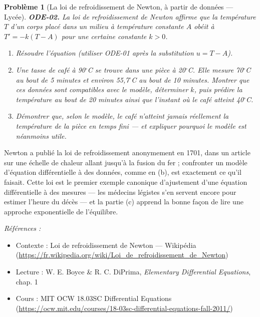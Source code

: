 \documentclass[11pt]{article}
\newtheorem{problem}{Problème}
\newenvironment{refs}{\par\small\noindent\emph{Références :}\begin{itemize}\setlength\itemsep{0pt}}{\end{itemize}\normalsize}
\begin{document}
\bigskip

\begin{problem}[{La loi de refroidissement de Newton, à partir de données --- Lycée}]
\textbf{ODE-02.} La loi de refroidissement de Newton affirme que la température $ T $ d'un
corps placé dans un milieu à température constante $ A $ obéit à $ T' = -k (T - A) $ pour une
certaine constante $ k >0 $.
\begin{enumerate}
\item[(a)] Résoudre l'équation (utiliser ODE-01 après la substitution $ u = T - A $).
\item[(b)] Une tasse de café à 90$^\circ$C se trouve dans une pièce à 20$^\circ$C. Elle mesure 70$^\circ$C au
bout de 5 minutes et environ 55,7$^\circ$C au bout de 10 minutes. Montrer que ces données sont
compatibles avec le modèle, déterminer $ k $, puis prédire la température au bout de 20 minutes
ainsi que l'instant où le café atteint 40$^\circ$C.
\item[(c)] Démontrer que, selon le modèle, le café n'atteint jamais réellement la température de la
pièce en temps fini --- et expliquer pourquoi le modèle est néanmoins utile.
\end{enumerate}

\end{problem}

\noindent Newton a publié la loi de refroidissement anonymement en 1701, dans un article
sur une échelle de chaleur allant jusqu'à la fusion du fer ; confronter un modèle d'équation
différentielle à des données, comme en (b), est exactement ce qu'il faisait. Cette loi est le
premier exemple canonique d'ajustement d'une équation différentielle à des mesures --- les
médecins légistes s'en servent encore pour estimer l'heure du décès --- et la partie (c) apprend
la bonne façon de lire une approche exponentielle de l'équilibre.

\begin{refs}
\item Contexte : Loi de refroidissement de Newton --- Wikipédia (\url{https://fr.wikipedia.org/wiki/Loi_de_refroidissement_de_Newton})
\item Lecture : W. E. Boyce \& R. C. DiPrima, \textit{Elementary Differential Equations}, chap. 1
\item Cours : MIT OCW 18.03SC Differential Equations (\url{https://ocw.mit.edu/courses/18-03sc-differential-equations-fall-2011/})
\end{refs}

\bigskip
\end{document}
